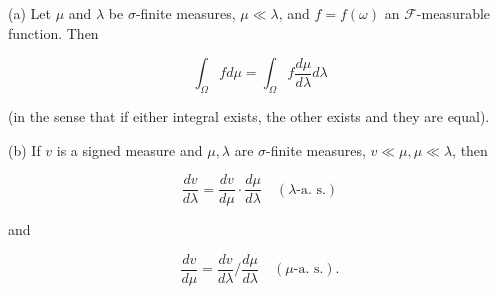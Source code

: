 (a) Let $\mu$ and $\lambda$ be $\sigma$-finite measures, $\mu \ll \lambda$, and $f = f(\omega)$ an $\mathcal{F}$-measurable function. Then

$$\int_{\Omega} f d\mu = \int_{\Omega} f \frac{d\mu}{d\lambda} d\lambda$$

(in the sense that if either integral exists, the other exists and they are equal).

(b) If $v$ is a signed measure and $\mu, \lambda$ are $\sigma$-finite measures, $v \ll \mu, \mu \ll \lambda$, then

$$\frac{dv}{d\lambda} = \frac{dv}{d\mu} \cdot \frac{d\mu}{d\lambda} \quad (\lambda\text{-a. s.})$$

and

$$\frac{dv}{d\mu} = \frac{dv}{d\lambda} \Bigg / \frac{d\mu}{d\lambda} \quad (\mu\text{-a. s.}).$$
